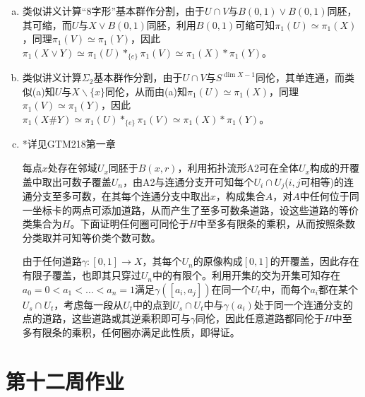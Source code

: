 \documentclass[a4paper,UTF8,fontset=windows]{ctexart}
\begin{document}
\begin{enumerate}[(1)]
\begin{enumerate}[(a)]
    \item
    类似讲义计算“8字形”基本群作分割，由于$U\cap V$与$B(0,1)\vee B(0,1)$同胚，其可缩，而$U$与$X\vee B(0,1)$同胚，利用$B(0,1)$可缩可知$\pi_1(U)\simeq\pi_1(X)$，同理$\pi_1(V)\simeq\pi_1(Y)$，因此$\pi_1(X\vee Y)\simeq\pi_1(U)*_{\{e\}}\pi_1(V)\simeq\pi_1(X)*\pi_1(Y)$。
    
    \item
    类似讲义计算$\Sigma_2$基本群作分割，由于$U\cap V$与$S^{\dim X-1}$同伦，其单连通，而类似(a)知$U$与$X\backslash\{x\}$同伦，从而由(a)知$\pi_1(U)\simeq\pi_1(X)$，同理$\pi_1(V)\simeq\pi_1(Y)$，因此$\pi_1(X\#Y)\simeq\pi_1(U)*_{\{e\}}\pi_1(V)\simeq\pi_1(X)*\pi_1(Y)$。
    
    \item
    *详见GTM218第一章
    
    每点$x$处存在邻域$U_x$同胚于$B(x,r)$，利用拓扑流形A2可在全体$U_x$构成的开覆盖中取出可数子覆盖$U_n$，由A2与连通分支开可知每个$U_i\cap U_j$($i,j$可相等)的连通分支至多可数，在其每个连通分支中取出$x$，构成集合$A$，对$A$中任何位于同一坐标卡的两点可添加道路，从而产生了至多可数条道路，设这些道路的等价类集合为$H$。下面证明任何圈可同伦于$H$中至多有限条的乘积，从而按照条数分类取并可知等价类个数可数。
    
    由于任何道路$\gamma:[0,1]\to X$，其每个$U_n$的原像构成$[0,1]$的开覆盖，因此存在有限子覆盖，也即其只穿过$U_n$中的有限个。利用开集的交为开集可知存在$a_0=0<a_1<\dots<a_n=1$满足$\gamma([a_i,a_j])$在同一个$U_t$中，而每个$a_i$都在某个$U_s\cap U_t$，考虑每一段从$U_t$中的点到$U_s\cap U_t$中与$\gamma(a_i)$处于同一个连通分支的点的道路，这些道路或其逆乘积即可与$\gamma$同伦，因此任意道路都同伦于$H$中至多有限条的乘积，任何圈亦满足此性质，即得证。
    \end{enumerate}
\end{enumerate}

\section{第十二周作业}
\end{document}
